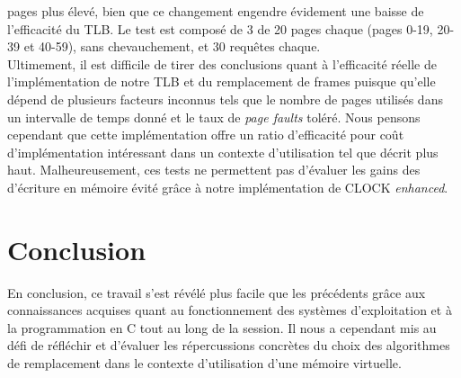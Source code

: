 \documentclass{article}
\begin{document}
pages plus élevé, bien que ce changement engendre évidement une baisse de l’efficacité du TLB. Le test est composé de 3  de 20 pages
 chaque (pages 0-19, 20-39 et 40-59), sans chevauchement, et 30 requêtes chaque. 
\\
Ultimement, il est difficile de tirer des conclusions quant à l’efficacité réelle de l’implémentation de notre TLB et du remplacement de frames 
puisque qu’elle dépend de plusieurs facteurs inconnus tels que le nombre de pages utilisés dans un intervalle de temps donné et le taux de  \emph{page faults}
 toléré. Nous pensons cependant que cette implémentation offre un ratio d’efficacité pour coût d’implémentation intéressant dans un contexte 
d’utilisation tel que décrit plus haut. Malheureusement, ces tests ne permettent pas d’évaluer les gains des d’écriture en mémoire évité grâce à
 notre implémentation de CLOCK \emph{enhanced}.
 \\
\section{Conclusion}
En conclusion, ce travail s’est révélé plus facile que les précédents grâce aux connaissances acquises quant au fonctionnement des systèmes
 d’exploitation et à la programmation en C tout au long de la session. Il nous a cependant mis au défi de réfléchir et d’évaluer les répercussions 
 concrètes du choix des algorithmes de remplacement dans le contexte d’utilisation d’une mémoire virtuelle.
 

\setlength{\parindent}{20pt}
\end{document}

